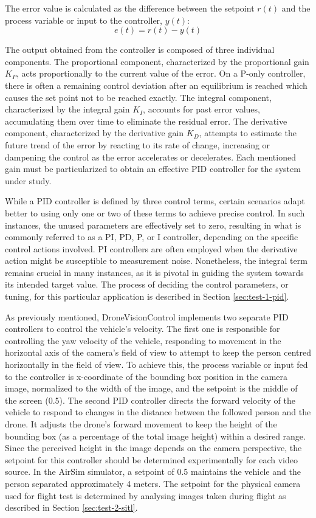 The error value is calculated as the difference between the setpoint $r(t)$ and the process variable or input to the controller, $y(t)$:
\begin{equation}
    e(t)= r(t) - y(t)
\end{equation}

The output obtained from the controller is composed of three individual components. The proportional component, characterized by the proportional gain $K_P$, acts proportionally to the current value of the error. On a P-only controller, there is often a remaining control deviation after an equilibrium is reached which causes the set point not to be reached exactly. The integral component, characterized by the integral gain $K_I$, accounts for past error values, accumulating them over time to eliminate the residual error. The derivative component, characterized by the derivative gain $K_D$, attempts to estimate the future trend of the error by reacting to its rate of change, increasing or dampening the control as the error accelerates or decelerates. Each mentioned gain must be particularized to obtain an effective PID controller for the system under study.

While a PID controller is defined by three control terms, certain scenarios adapt better to using only one or two of these terms to achieve precise control. In such instances, the unused parameters are effectively set to zero, resulting in what is commonly referred to as a PI, PD, P, or I controller, depending on the specific control actions involved. PI controllers are often employed when the derivative action might be susceptible to measurement noise. Nonetheless, the integral term remains crucial in many instances, as it is pivotal in guiding the system towards its intended target value. The process of deciding the control parameters, or tuning, for this particular application is described in Section \ref{sec:test-1-pid}.

As previously mentioned, DroneVisionControl implements two separate PID controllers to control the vehicle's velocity.
The first one is responsible for controlling the yaw velocity of the vehicle, responding to movement in the horizontal axis of the camera's field of view to attempt to keep the person centred horizontally in the field of view. To achieve this, the process variable or input fed to the controller is x-coordinate of the bounding box position in the camera image, normalized to the width of the image, and the setpoint is the middle of the screen (0.5).
The second PID controller directs the forward velocity of the vehicle to respond to changes in the distance between the followed person and the drone. It adjusts the drone's forward movement to keep the height of the bounding box (as a percentage of the total image height) within a desired range. Since the perceived height in the image depends on the camera perspective, the setpoint for this controller should be determined experimentally for each video source.
In the AirSim simulator, a setpoint of 0.5 maintains the vehicle and the person separated approximately 4 meters. The setpoint for the physical camera used for flight test is determined by analysing images taken during flight as described in Section \ref{sec:test-2-sitl}.

